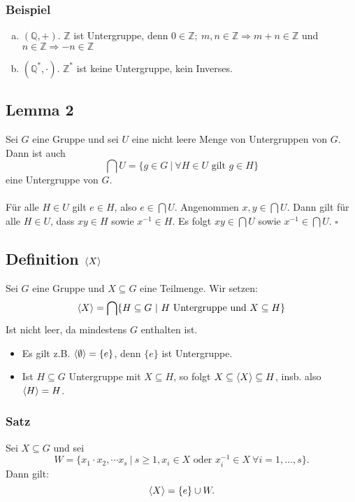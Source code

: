 \subsubsection*{Beispiel}
\begin{enumerate}[(a)]
	\item $(\mathds{Q}, +)$. $\mathds{Z}$  ist Untergruppe, denn $0 \in \mathds{Z};~ m,n \in \mathds{Z} \Rightarrow m+n\in \mathds{Z}$ und $n\in \mathds{Z} \Rightarrow -n\in \mathds{Z}$
	\item $(\mathds{Q}^*,\cdot)$. $\mathds{Z}^*$ ist keine Untergruppe, kein Inverses.
\end{enumerate}

\subsection{Lemma 2}
\label{sub:lemma_2}
Sei $G$ eine Gruppe und sei $U$ eine nicht leere Menge von Untergruppen von $G$. 
Dann ist auch
\[
\bigcap U = \{g\in G~|~\forall H\in U \text{ gilt } g\in H\}
\]
eine Untergruppe von $G$.\\

\\
Für alle $H\in U$ gilt $e\in H$, also $e\in \bigcap U$. 
Angenommen $x,y\in \bigcap U$. 
Dann gilt für alle $H\in U$, dass $xy\in H$ sowie $x^{-1}\in H$. 
Es folgt $xy\in \bigcap U$ sowie $x^{-1}\in \bigcap U$.
\hfill $\square$

\subsection{Definition $\langle X \rangle$}
\label{sub:def_lhX}
Sei $G$ eine Gruppe und $X \subseteq G$ eine Teilmenge. 
Wir setzen:
\[
\langle X \rangle=\bigcap\{H\subseteq G~|~H \text{ Untergruppe und } X \subseteq H\}
\]
Ist nicht leer, da mindestens $G$ enthalten ist.
\begin{itemize}
	\item Es gilt z.B. $\langle \emptyset \rangle=\{e\}$, denn $\{e\}$ ist Untergruppe.
	\item Ist $H \subseteq G$ Untergruppe mit $X \subseteq H$, so folgt $X\subseteq \langle X \rangle \subseteq H$, insb. also $\langle H \rangle=H$.
\end{itemize}

\subsubsection*{Satz}
Sei $X \subseteq G$ und sei 
\[
W=\{x_1\cdot x_2,\cdots x_s~|~s\ge 1, x_i\in X \text{ oder } x_i^{-1}\in X ~\forall i=1,\dots,s\}.
\]
Dann gilt:
\[
\langle X \rangle=\{e\}\cup W.
\]


